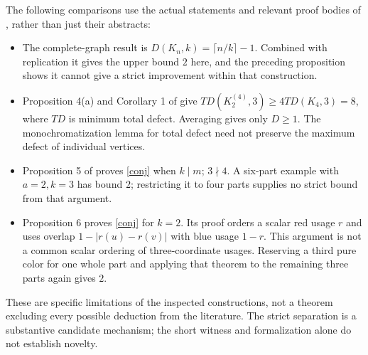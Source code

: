 \documentclass[11pt]{article}
\begin{document}
The following comparisons use the actual statements and relevant proof
bodies of \cite{v1,v2,author}, rather than just their abstracts:
\begin{itemize}
\item The complete-graph result is
$D(K_n,k)=\lceil n/k\rceil-1$. Combined with replication it gives the upper
bound $2$ here, and the preceding proposition shows it cannot give a strict
improvement within that construction.
\item Proposition 4(a) and Corollary 1 of \cite{v2} give
$TD(K_2^{(4)},3)\geq4TD(K_4,3)=8$, where $TD$ is minimum total defect.
Averaging gives only $D\geq1$. The monochromatization lemma for total defect
need not preserve the maximum defect of individual vertices.
\item Proposition 5 of \cite{v2} proves \eqref{conj} when $k\mid m$;
$3\nmid4$. A six-part example with $a=2,k=3$ has bound $2$;
restricting it to four parts supplies no strict bound from that argument.
\item Proposition 6 proves \eqref{conj} for $k=2$. Its proof orders a scalar
red usage $r$ and uses overlap $1-|r(u)-r(v)|$ with blue usage $1-r$.
This argument is not a common scalar ordering of three-coordinate usages.
Reserving a third pure color for one whole part and applying that theorem
to the remaining three parts again gives $2$.
\end{itemize}
These are specific limitations of the inspected constructions, not a theorem
excluding every possible deduction from the literature. The strict separation
is a substantive candidate mechanism; the short witness and formalization
alone do not establish novelty.

\newpage
\end{document}
